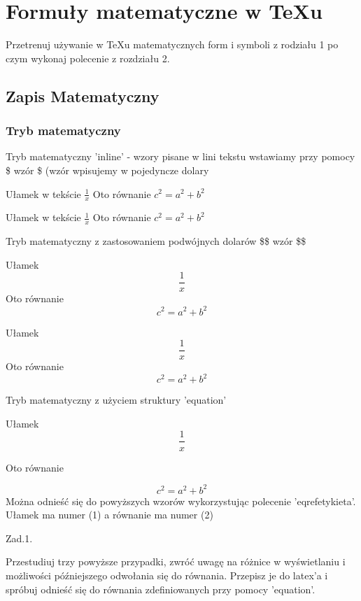 \documentclass{article}
\begin{document}
\section{Formuły matematyczne w TeXu}
Przetrenuj używanie w TeXu matematycznych form i symboli z rodziału 1 po czym wykonaj polecenie z rozdziału 2.
\subsection{Zapis Matematyczny}
\subsubsection{Tryb matematyczny}
Tryb matematyczny 'inline' - wzory pisane w lini tekstu wstawiamy przy pomocy \$ wzór \$ (wzór wpisujemy w pojedyncze dolary

Ułamek w tekście $ \frac{1}{x} $ 
Oto równanie $c^{2}=a^{2}+b^{2}$

\noindent 
Ułamek w tekście $ \frac{1}{x}$ 
Oto równanie $c^{2}=a^{2}+b^{2}$


	Tryb matematyczny z zastosowaniem podwójnych dolarów \$\$ wzór \$\$


Ułamek $$ \frac{1}{x} $$ 
Oto równanie $$c^{2}=a^{2}+b^{2}$$



\noindent 
Ułamek $$ \frac{1}{x} $$ 
Oto równanie $$c^{2}=a^{2}+b^{2}$$

Tryb matematyczny z użyciem struktury 'equation'


Ułamek
\begin{equation}
\frac{1}{x}
\label{eq:równanie1}
\end{equation}

Oto równanie 

\begin{equation}
c^{2}=a^{2}+b^{2}
\label{eq:równanie2}
\end{equation}
Można odnieść się do powyższych wzorów wykorzystując polecenie 'eqref{etykieta}'.
Ułamek ma numer (1) a równanie ma numer (2)

	Zad.1.
	
	Przestudiuj trzy powyższe przypadki, zwróć uwagę na różnice w wyświetlaniu i możliwości późniejszego odwołania się do równania. Przepisz je do latex'a i spróbuj odnieść się do równania zdefiniowanych przy pomocy 'equation'.
\end{document}
